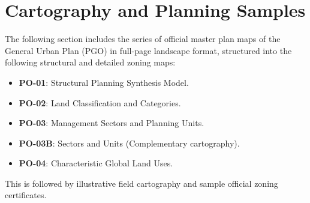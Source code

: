\section{Cartography and Planning Samples}

The following section includes the series of official master plan maps of the General Urban Plan (PGO) in full-page landscape format, structured into the following structural and detailed zoning maps:
\begin{itemize}
  \item \textbf{PO-01}: Structural Planning Synthesis Model.
  \item \textbf{PO-02}: Land Classification and Categories.
  \item \textbf{PO-03}: Management Sectors and Planning Units.
  \item \textbf{PO-03B}: Sectors and Units (Complementary cartography).
  \item \textbf{PO-04}: Characteristic Global Land Uses.
\end{itemize}
This is followed by illustrative field cartography and sample official zoning certificates.












